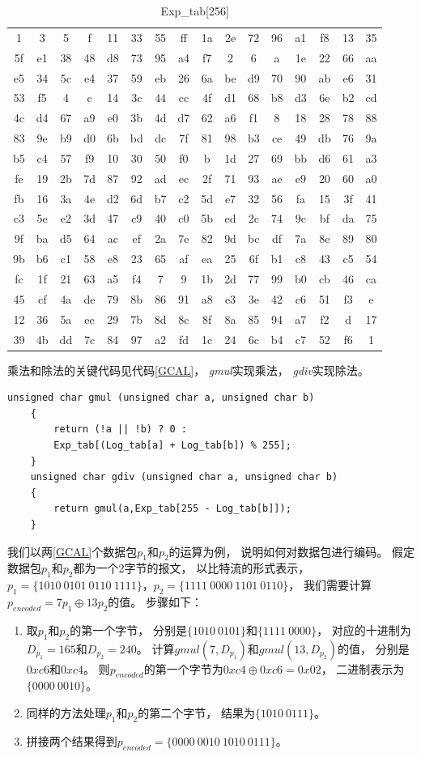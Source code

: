 \begin{table}[htb]
	\caption{Exp\_tab[256]}
	\centering
	\begin{tabular}{cccccccccccccccc}
		\toprule
 1& 3& 5& f&11&33&55&ff&1a&2e&72&96&a1&f8&13&35\\
5f&e1&38&48&d8&73&95&a4&f7& 2& 6& a&1e&22&66&aa\\
e5&34&5c&e4&37&59&eb&26&6a&be&d9&70&90&ab&e6&31\\
53&f5& 4& c&14&3c&44&cc&4f&d1&68&b8&d3&6e&b2&cd\\
4c&d4&67&a9&e0&3b&4d&d7&62&a6&f1& 8&18&28&78&88\\
83&9e&b9&d0&6b&bd&dc&7f&81&98&b3&ce&49&db&76&9a\\
b5&c4&57&f9&10&30&50&f0& b&1d&27&69&bb&d6&61&a3\\
fe&19&2b&7d&87&92&ad&ec&2f&71&93&ae&e9&20&60&a0\\
fb&16&3a&4e&d2&6d&b7&c2&5d&e7&32&56&fa&15&3f&41\\
c3&5e&e2&3d&47&c9&40&c0&5b&ed&2c&74&9c&bf&da&75\\
9f&ba&d5&64&ac&ef&2a&7e&82&9d&bc&df&7a&8e&89&80\\
9b&b6&c1&58&e8&23&65&af&ea&25&6f&b1&c8&43&c5&54\\
fc&1f&21&63&a5&f4& 7& 9&1b&2d&77&99&b0&cb&46&ca\\
45&cf&4a&de&79&8b&86&91&a8&e3&3e&42&c6&51&f3& e\\
12&36&5a&ee&29&7b&8d&8c&8f&8a&85&94&a7&f2& d&17\\
39&4b&dd&7c&84&97&a2&fd&1c&24&6c&b4&c7&52&f6& 1\\
		\bottomrule
	\end{tabular}
	\label{Exptab}
\end{table}
乘法和除法的关键代码见代码\ref{GCAL}，
\emph{gmul}实现乘法，
\emph{gdiv}实现除法。
	\begin{lstlisting}[float,caption=gmul和gdiv实现,label={GCAL},language={[ANSI]C}]
	unsigned char gmul (unsigned char a, unsigned char b)
	{
		return (!a || !b) ? 0 : 
		Exp_tab[(Log_tab[a] + Log_tab[b]) % 255];
	}
	unsigned char gdiv (unsigned char a, unsigned char b)
	{
		return gmul(a,Exp_tab[255 - Log_tab[b]]);
	}
	\end{lstlisting}

\par
我们以两\ref{GCAL}个数据包$p_{1}$和$p_{2}$的运算为例，
说明如何对数据包进行编码。
假定数据包$p_{1}$和$p_{2}$都为一个2字节的报文，
以比特流的形式表示，
$p_{1}=\{1010\ 0101\ 0110\ 1111\}$，$p_{2}=\{1111\ 0000\ 1101\ 0110\}$，
我们需要计算$p_{encoded}=7p_{1} \oplus 13p_{2}$的值。
步骤如下：
\begin{enumerate}[fullwidth,itemindent=2em,label=(\arabic*)]
	\item 取$p_{1}$和$p_{2}$的第一个字节，
	分别是$\{1010\ 0101\}$和$\{1111\ 0000\}$，
	对应的十进制为$D_{p_1}=165$和$D_{p_2}=240$。
	计算$gmul\left(7,D_{p_1}\right)$和$gmul\left(13,D_{p_2}\right)$的值，
	分别是$0xc6$和$0xc4$。
	则$p_{encoded}$的第一个字节为$0xc4 \oplus 0xc6=0x02$，
	二进制表示为$\{0000\ 0010\}$。
	\item 同样的方法处理$p_{1}$和$p_{2}$的第二个字节，
	结果为$\{1010\ 0111\}$。
	\item 拼接两个结果得到$p_{encoded}=\{0000\ 0010\ 1010\ 0111\}$。
\end{enumerate}
